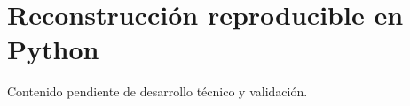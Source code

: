 \section{Reconstrucción reproducible en Python}

Contenido pendiente de desarrollo técnico y validación.

